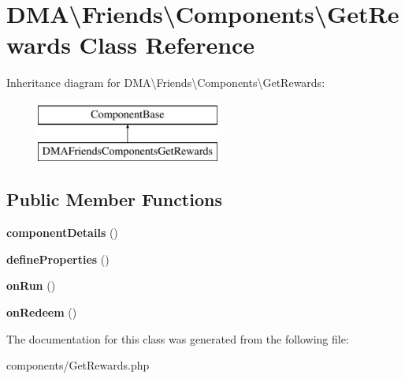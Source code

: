 \hypertarget{classDMA_1_1Friends_1_1Components_1_1GetRewards}{\section{D\-M\-A\textbackslash{}Friends\textbackslash{}Components\textbackslash{}Get\-Rewards Class Reference}
\label{classDMA_1_1Friends_1_1Components_1_1GetRewards}
}
Inheritance diagram for D\-M\-A\textbackslash{}Friends\textbackslash{}Components\textbackslash{}Get\-Rewards\-:\begin{figure}[H]
\begin{center}
\leavevmode
\includegraphics[height=2.000000cm]{d7/de7/classDMA_1_1Friends_1_1Components_1_1GetRewards}
\end{center}
\end{figure}
\subsection*{Public Member Functions}
\begin{DoxyCompactItemize}
\item 
\hypertarget{classDMA_1_1Friends_1_1Components_1_1GetRewards_ade8efd6ec6ab8eabcc99fc102a8bb13f}{{\bfseries component\-Details} ()}\label{classDMA_1_1Friends_1_1Components_1_1GetRewards_ade8efd6ec6ab8eabcc99fc102a8bb13f}

\item 
\hypertarget{classDMA_1_1Friends_1_1Components_1_1GetRewards_a74220ab9e695cfeae6d2443a5bb5cdd0}{{\bfseries define\-Properties} ()}\label{classDMA_1_1Friends_1_1Components_1_1GetRewards_a74220ab9e695cfeae6d2443a5bb5cdd0}

\item 
\hypertarget{classDMA_1_1Friends_1_1Components_1_1GetRewards_a4d4d20f4b87c5f3ffc0e448dc349c0ce}{{\bfseries on\-Run} ()}\label{classDMA_1_1Friends_1_1Components_1_1GetRewards_a4d4d20f4b87c5f3ffc0e448dc349c0ce}

\item 
\hypertarget{classDMA_1_1Friends_1_1Components_1_1GetRewards_ae6fdcdd1ef7c47b26cb20f36512e73ae}{{\bfseries on\-Redeem} ()}\label{classDMA_1_1Friends_1_1Components_1_1GetRewards_ae6fdcdd1ef7c47b26cb20f36512e73ae}

\end{DoxyCompactItemize}


The documentation for this class was generated from the following file\-:\begin{DoxyCompactItemize}
\item 
components/Get\-Rewards.\-php\end{DoxyCompactItemize}
